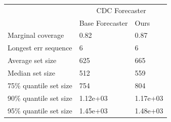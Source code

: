 \begin{tabular}{lll}
\toprule
& \multicolumn{2}{c}{CDC Forecaster} \\
& Base Forecaster & Ours \\
\midrule
Marginal coverage & 0.82 & 0.87 \\
Longest err sequence & 6 & 6 \\
Average set size & 625 & 665 \\
Median set size & 512 & 559 \\
75\% quantile set size & 754 & 804 \\
90\% quantile set size & 1.12e+03 & 1.17e+03 \\
95\% quantile set size & 1.45e+03 & 1.48e+03 \\
\bottomrule
\end{tabular}
